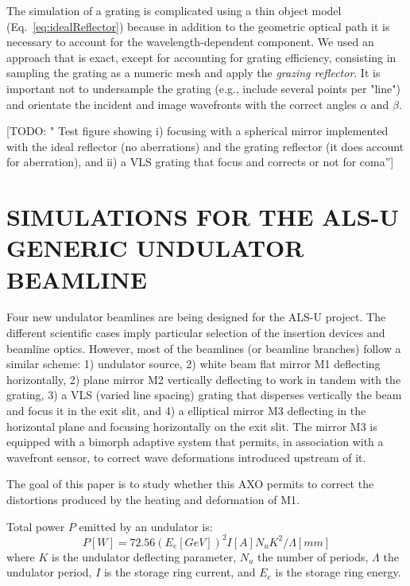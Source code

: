 \documentclass[]{spie}  %
\newcommand{\todo}[1]{{\color{red}[TODO: "#1'']}}
\begin{document}
The simulation of a grating is complicated using a thin object model (Eq.~\ref{eq:idealReflector}) because in addition to the geometric optical path it is necessary to account for the wavelength-dependent component. We used an approach that is exact, except for accounting for grating efficiency, consisting in sampling the grating as a numeric mesh and apply the {\it grazing reflector}. It is important not to undersample the grating (e.g., include several points per "line") and orientate the incident and image wavefronts with the correct angles $\alpha$ and $\beta$.      

\todo{  Test figure showing i) focusing with a spherical mirror implemented with the ideal reflector (no aberrations) and the grating reflector (it does account for aberration), and ii) a VLS grating that focus and corrects or not for coma}


\section{SIMULATIONS FOR THE ALS-U GENERIC UNDULATOR BEAMLINE}
Four new undulator beamlines are being designed for the ALS-U project. The different scientific cases imply particular selection of the insertion devices and beamline optics. However, most of the beamlines (or beamline branches) follow a similar scheme: 1) undulator source, 2) white beam flat mirror M1 deflecting horizontally, 2) plane mirror M2 vertically deflecting to work in tandem with the grating, 3) a VLS (varied line spacing) grating that disperses vertically the beam and focus it in the exit slit, and 4) a elliptical mirror M3 deflecting in the horizontal plane and focusing horizontally on the exit slit. The mirror M3 is equipped with a bimorph adaptive system that permits, in association with a wavefront sensor, to correct wave deformations introduced upstream of it.

The goal of this paper is to study whether this AXO permits to correct the distortions produced by the heating and deformation of M1.

Total power $P$ emitted by an undulator is: 
\begin{equation}
    P [W] = 72.56  (E_e [GeV])^2  I[A]  N_u  K^2 / \Lambda[mm]
\end{equation}
where $K$ is the undulator deflecting parameter, $N_u$ the number of periods, $\Lambda$ the undulator period, $I$ is the storage ring current, and $E_e$ is the storage ring energy. 
\end{document}
